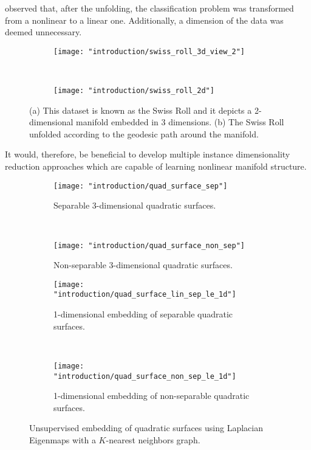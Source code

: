 observed that, after the unfolding, the classification problem was transformed from a nonlinear to a linear one.  Additionally, a dimension of the data was deemed unnecessary.
\begin{figure*}[t!]
	\centering
	\begin{subfigure}[t]{0.5\textwidth}
		\centering
		\texttt{[image: "introduction/swiss\_roll\_3d\_view\_2"]}
		\caption{}
		\label{fig:swiss_roll_3d}
	\end{subfigure}%
	~ 
	\begin{subfigure}[t]{0.5\textwidth}
		\centering
		\texttt{[image: "introduction/swiss\_roll\_2d"]}
		\caption{}
		\label{fig:swiss_roll_2d}
	\end{subfigure}
	\caption[Swiss Roll manifold unfolding.]{(a) This dataset is known as the Swiss Roll and it depicts a 2-dimensional manifold embedded in 3 dimensions.  (b) The Swiss Roll unfolded according to the geodesic path around the manifold.}
	\label{fig:swiss_roll}%
\end{figure*}  
It would, therefore, be beneficial to develop multiple instance dimensionality reduction approaches which are capable of learning nonlinear manifold structure.  

\begin{figure*}[t!]
	\centering
	\begin{subfigure}[t]{0.5\textwidth}
		\centering
		\texttt{[image: "introduction/quad\_surface\_sep"]}
		\caption{Separable 3-dimensional quadratic surfaces.}
		\label{fig:quad_surface_sep}
	\end{subfigure}%
	~ 
	\begin{subfigure}[t]{0.5\textwidth}
		\centering
		\texttt{[image: "introduction/quad\_surface\_non\_sep"]}
		\caption{Non-separable 3-dimensional quadratic surfaces.}
		\label{fig:quad_surface_non_sep}
	\end{subfigure}
	
	
	\begin{subfigure}[t]{0.5\textwidth}
		\centering
		\texttt{[image: "introduction/quad\_surface\_lin\_sep\_le\_1d"]}
		\caption{1-dimensional embedding of separable quadratic surfaces.}
		\label{fig:quad_surface_sep_le_1d}
	\end{subfigure}%
	~ 
	\begin{subfigure}[t]{0.5\textwidth}
		\centering
		\texttt{[image: "introduction/quad\_surface\_non\_sep\_le\_1d"]}
		\caption{1-dimensional embedding of non-separable quadratic surfaces.}
		\label{fig:quad_surface_non_sep_le_1d}
	\end{subfigure}
	\caption[Unsupervised embedding of quadratic surfaces]{Unsupervised embedding of quadratic surfaces using Laplacian Eigenmaps with a $K$-nearest neighbors graph.}
	\label{fig:quad_surfaces_no_labels}%
\end{figure*} 

